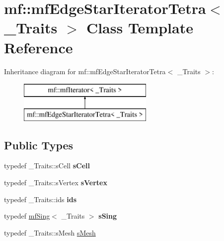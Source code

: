 \hypertarget{classmf_1_1mfEdgeStarIteratorTetra}{
\section{mf::mfEdgeStarIteratorTetra$<$ \_\-Traits $>$ Class Template Reference}
\label{classmf_1_1mfEdgeStarIteratorTetra}
}
Inheritance diagram for mf::mfEdgeStarIteratorTetra$<$ \_\-Traits $>$:\begin{figure}[H]
\begin{center}
\leavevmode
\includegraphics[height=2.000000cm]{classmf_1_1mfEdgeStarIteratorTetra}
\end{center}
\end{figure}
\subsection*{Public Types}
\begin{DoxyCompactItemize}
\item 
\hypertarget{classmf_1_1mfEdgeStarIteratorTetra_af5ea46fe004d7712f91d6059b67c6754}{
typedef \_\-Traits::sCell {\bfseries sCell}}
\label{classmf_1_1mfEdgeStarIteratorTetra_af5ea46fe004d7712f91d6059b67c6754}

\item 
\hypertarget{classmf_1_1mfEdgeStarIteratorTetra_a3ee0be7a8bd43274196ae7448bd5b3e5}{
typedef \_\-Traits::sVertex {\bfseries sVertex}}
\label{classmf_1_1mfEdgeStarIteratorTetra_a3ee0be7a8bd43274196ae7448bd5b3e5}

\item 
\hypertarget{classmf_1_1mfEdgeStarIteratorTetra_afb4c9a31307581a7bf461acdf3508e63}{
typedef \_\-Traits::ids {\bfseries ids}}
\label{classmf_1_1mfEdgeStarIteratorTetra_afb4c9a31307581a7bf461acdf3508e63}

\item 
\hypertarget{classmf_1_1mfEdgeStarIteratorTetra_a66677bff586f449a4c176a2c766a17ac}{
typedef \hyperlink{classmf_1_1mfSing}{mfSing}$<$ \_\-Traits $>$ {\bfseries sSing}}
\label{classmf_1_1mfEdgeStarIteratorTetra_a66677bff586f449a4c176a2c766a17ac}

\item 
typedef \_\-Traits::sMesh \hyperlink{classmf_1_1mfEdgeStarIteratorTetra_abbb7ca848037b976d69368943567397b}{sMesh}
\end{DoxyCompactItemize}
